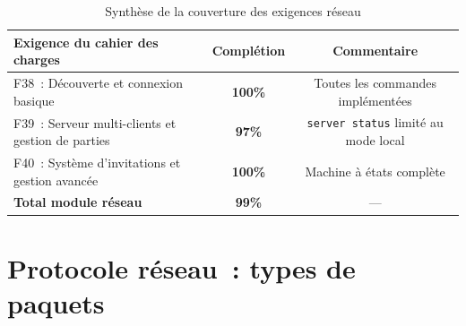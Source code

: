 \documentclass[a4paper]{article}
\begin{document}
\begin{table}[H]
\centering
\renewcommand{\arraystretch}{1.5}
\begin{tabular}{|l|c|c|}
\hline
\textbf{Exigence du cahier des charges} & \textbf{Complétion} & \textbf{Commentaire} \\
\hline
F38~: Découverte et connexion basique & \textbf{100\%} & Toutes les commandes implémentées \\
\hline
F39~: Serveur multi-clients et gestion de parties & \textbf{97\%} & \texttt{server status} limité au mode local \\
\hline
F40~: Système d'invitations et gestion avancée & \textbf{100\%} & Machine à états complète \\
\hline
\textbf{Total module réseau} & \textbf{99\%} & --- \\
\hline
\end{tabular}
\caption{Synthèse de la couverture des exigences réseau}
\label{tab:summary-reseau}
\end{table}
 
 
 
\section{Protocole réseau~: types de paquets}
\label{ann:protocol-types}
 
\end{document}
